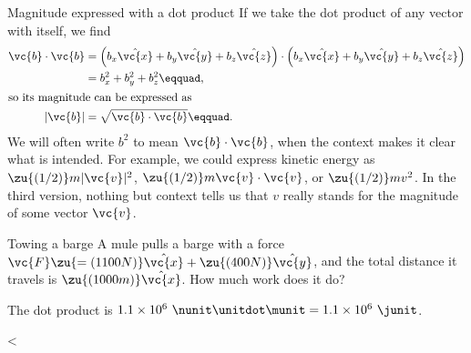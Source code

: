         \begin{eg}{Magnitude expressed with a dot product}\label{eg:magnitudedot}
        If we take the dot product of any vector  with itself, we find
        \begin{align*}        
                \vc{b}\cdot\vc{b}        &= 
                \left( b_{x}\hat{\vc{x}}+ b_{y}\hat{\vc{y}}+ b_z\hat{\vc{z}}\right)
                \cdot
                \left( b_{x}\hat{\vc{x}}+ b_{y}\hat{\vc{y}}+ b_z\hat{\vc{z}}\right) \\
                        &=  b_{x}^2+ b_{y}^2+ b_z^2\eqquad,\\
        \intertext{so its magnitude can be expressed as}
                |\vc{b}| &= \sqrt{\vc{b}\cdot\vc{b}}\eqquad.
        \end{align*}
        We will often write $b^2$ to mean $\vc{b}\cdot\vc{b}$, when the context makes it
        clear what is intended. For example, we could express kinetic energy as
        $\zu{(1/2)} m|\vc{v}|^2$, $\zu{(1/2)} m\vc{v}\cdot\vc{v}$,
        or $\zu{(1/2)} m v^2$. In the third version, nothing but context tells
        us that $v$ really stands for the magnitude of some vector $\vc{v}$.
        \end{eg}

        \begin{eg}{Towing a barge}
        \egquestion
        A mule pulls a barge with a force $\vc{F}\zu{=(1100 N)}\hat{\vc{x}}+\zu{(400 N)}\hat{\vc{y}}$,
        and the total distance it travels is $\zu{(1000 m)}\hat{\vc{x}}$. How much work does it do?

        \eganswer
        The dot product is $1.1\times10^6\ \nunit\unitdot\munit = 1.1\times10^6\ \junit$.
        \end{eg}
<%
